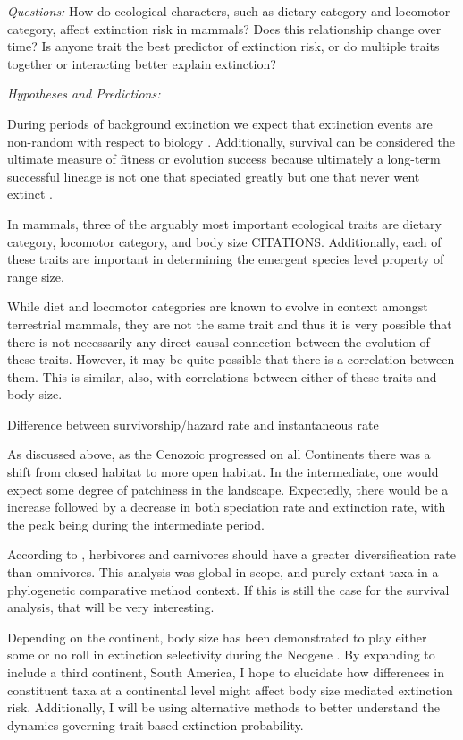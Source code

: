 \documentclass[12pt,letterpaper]{article}
\begin{document}
\textit{Questions:} How do ecological characters, such as dietary category and locomotor category, affect extinction risk in mammals? Does this relationship change over time? Is anyone trait the best predictor of extinction risk, or do multiple traits together or interacting better explain extinction?

\textit{Hypotheses and Predictions:} 

During periods of background extinction we expect that extinction events are non-random with respect to biology \citep{Jablonski1986}. Additionally, survival can be considered the ultimate measure of fitness or evolution success \citep{Cooper1984,Palmer2012} because ultimately a long-term successful lineage is not one that speciated greatly but one that never went extinct \citep{Palmer2012}.

In mammals, three of the arguably most important ecological traits are dietary category, locomotor category, and body size CITATIONS. Additionally, each of these traits are important in determining the emergent species level property of range size.

While diet and locomotor categories are known to evolve in context amongst terrestrial mammals, they are not the same trait and thus it is very possible that there is not necessarily any direct causal connection between the evolution of these traits. However, it may be quite possible that there is a correlation between them. This is similar, also, with correlations between either of these traits and body size.


Difference between survivorship/hazard rate and instantaneous rate

As discussed above, as the Cenozoic progressed on all Continents there was a shift from closed habitat to more open habitat. In the intermediate, one would expect some degree of patchiness in the landscape. Expectedly, there would be a increase followed by a decrease in both speciation rate and extinction rate, with the peak being during the intermediate period.

According to \citet{Price2012}, herbivores and carnivores should have a greater diversification rate than omnivores. This analysis was global in scope, and purely extant taxa in a phylogenetic comparative method context. If this is still the case for the survival analysis, that will be very interesting.


Depending on the continent, body size has been demonstrated to play either some or no roll in extinction selectivity during the Neogene \citep{Tomiya2013,Liow2008,Liow2009}. By expanding to include a third continent, South America, I hope to elucidate how differences in constituent taxa at a continental level might affect body size mediated extinction risk. Additionally, I will be using alternative methods to better understand the dynamics governing trait based extinction probability.
\end{document}
